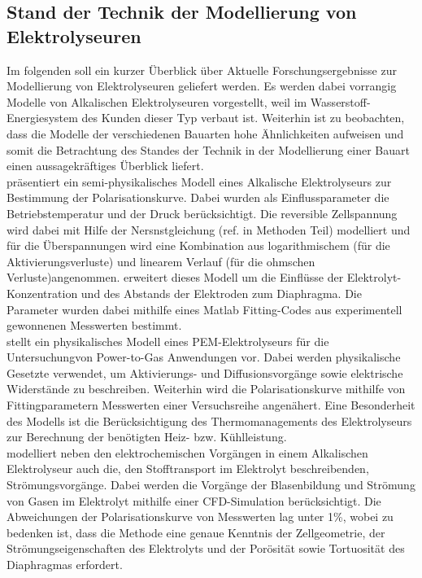 \subsection{Stand der Technik der Modellierung von Elektrolyseuren}
Im folgenden soll ein kurzer Überblick über Aktuelle Forschungsergebnisse zur Modellierung von Elektrolyseuren geliefert werden. Es werden dabei vorrangig Modelle von Alkalischen Elektrolyseuren vorgestellt, weil im Wasserstoff-Energiesystem des Kunden dieser Typ verbaut ist. Weiterhin ist zu beobachten, dass die Modelle der verschiedenen Bauarten hohe Ähnlichkeiten aufweisen und somit die Betrachtung des Standes der Technik in der Modellierung einer Bauart einen aussagekräftiges Überblick liefert.\\ 

\citet{ulleberg_modeling_2003} präsentiert ein semi-physikalisches Modell eines Alkalische Elektrolyseurs zur Bestimmung der Polarisationskurve. Dabei wurden als Einflussparameter die Betriebstemperatur und der Druck berücksichtigt. Die reversible Zellspannung wird dabei mit Hilfe der Nersnstgleichung (ref. in Methoden Teil) modelliert und für die Überspannungen wird eine Kombination aus logarithmischem (für die Aktivierungsverluste) und linearem Verlauf (für die ohmschen Verluste)angenommen. \citet{amores_influence_2014} erweitert dieses Modell um die Einflüsse der Elektrolyt-Konzentration und des Abstands der Elektroden zum Diaphragma. Die Parameter wurden dabei mithilfe eines Matlab Fitting-Codes aus experimentell gewonnenen Messwerten bestimmt.\\

\citet{tjarks_pem-elektrolyse-systeme_2017} stellt ein physikalisches Modell eines PEM-Elektrolyseurs für die Untersuchungvon Power-to-Gas Anwendungen vor. Dabei werden physikalische Gesetzte verwendet, um Aktivierungs- und Diffusionsvorgänge sowie elektrische Widerstände zu beschreiben. Weiterhin wird die Polarisationskurve mithilfe von Fittingparametern Messwerten einer Versuchsreihe angenähert. Eine Besonderheit des Modells ist die Berücksichtigung des Thermomanagements des Elektrolyseurs zur Berechnung der benötigten Heiz- bzw. Kühlleistung.\\

\citet{rodriguez_cfd_2020} modelliert neben den elektrochemischen Vorgängen in einem Alkalischen Elektrolyseur auch die, den Stofftransport im Elektrolyt beschreibenden, Strömungsvorgänge. Dabei werden die Vorgänge der Blasenbildung und Strömung von Gasen im Elektrolyt mithilfe einer CFD-Simulation berücksichtigt. Die Abweichungen der Polarisationskurve von Messwerten lag unter 1\%, wobei zu bedenken ist, dass die Methode eine genaue Kenntnis der Zellgeometrie, der Strömungseigenschaften des Elektrolyts und der Porösität sowie Tortuosität des Diaphragmas erfordert.

